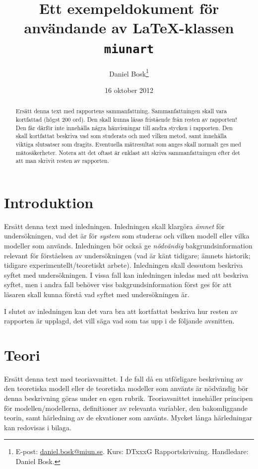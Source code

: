 \documentclass[a4paper,nologo]{miunart} %
\title{Ett exempeldokument för användande av \LaTeX-klassen \texttt{miunart}}
\author{Daniel Bosk\footnote{%
	E-post: \href{mailto:daniel.bosk@miun.se}{daniel.bosk@miun.se}.
	Kurs: DTxxxG Rapportskrivning.
	Handledare: Daniel Bosk.
}}
\date{16 oktober 2012}
\begin{document}
\maketitle
\begin{abstract}
	\noindent
	Ersätt denna text med rapportens sammanfattning.
	Sammanfattningen skall vara kortfattad (högst 200 ord).
	Den skall kunna läsas fristående från resten av rapporten!
	Den får därför inte innehålla några hänvisningar till andra stycken 
	i rapporten.
	Den skall kortfattat beskriva vad som studerats och med vilken metod, samt 
	innehålla viktiga slutsatser som dragits.
	Eventuella mätresultat som anges skall normalt ges med mätosäkerheter.
	Notera att det oftast är enklast att skriva sammanfattningen efter det att 
	man skrivit resten av rapporten.

\end{abstract}


\section{Introduktion}
\label{sec:intro}
\noindent
Ersätt denna text med inledningen.
Inledningen skall klargöra \emph{ämnet} för undersökningen, vad det är för 
\emph{system} som studeras och vilken modell eller vilka modeller som används.
Inledningen bör också ge \emph{nödvändig} bakgrundsinformation relevant för 
förståelsen av undersökningen (vad är känt tidigare; ämnets historik; tidigare 
experimentellt/teoretiskt arbete).
Inledningen skall dessutom beskriva syftet med undersökningen.
I vissa fall kan inledningen inledas med att beskriva syftet, men i andra fall 
behöver viss bakgrundsinformation först ges för att läsaren skall kunna förstå 
vad syftet med undersökningen är.

I slutet av inledningen kan det vara bra att kortfattat beskriva hur resten av 
rapporten är upplagd, det vill säga vad som tas upp i de följande avsnitten.


\section{Teori}
\label{sec:theory}
\noindent
Ersätt denna text med teoriavsnittet.
I de fall då en utförligare beskrivning av den teoretiska modell eller de 
teoretiska modeller som använts är nödvändig bör denna beskrivning göras under 
en egen rubrik.
Teoriavsnittet innehåller principen för modellen/modellerna, definitioner av 
relevanta variabler, den bakomliggande teorin, samt härledning av de ekvationer 
som använts.
Mycket långa härledningar kan redovisas i bilaga.
\end{document}
